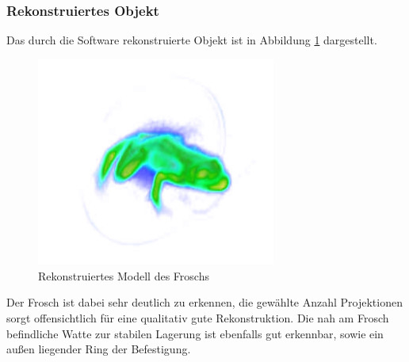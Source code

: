 \documentclass[11pt, a4paper]{article}
\numberwithin{equation}{section}
\begin{document}
\subsubsection{Rekonstruiertes Objekt}
Das durch die Software rekonstruierte Objekt ist in Abbildung \ref{fig:ct_frosch} dargestellt.
\begin{figure}[ht]
	\centering
	\includegraphics[width=0.7\textwidth]{./figures/ct/frosch.jpg}
	\caption{Rekonstruiertes Modell des Froschs}
	\label{fig:ct_frosch}
\end{figure}
Der Frosch ist dabei sehr deutlich zu erkennen, die gewählte Anzahl Projektionen sorgt offensichtlich für eine qualitativ gute Rekonstruktion.
Die nah am Frosch befindliche Watte zur stabilen Lagerung ist ebenfalls gut erkennbar, sowie ein außen liegender Ring der Befestigung.
\end{document}
